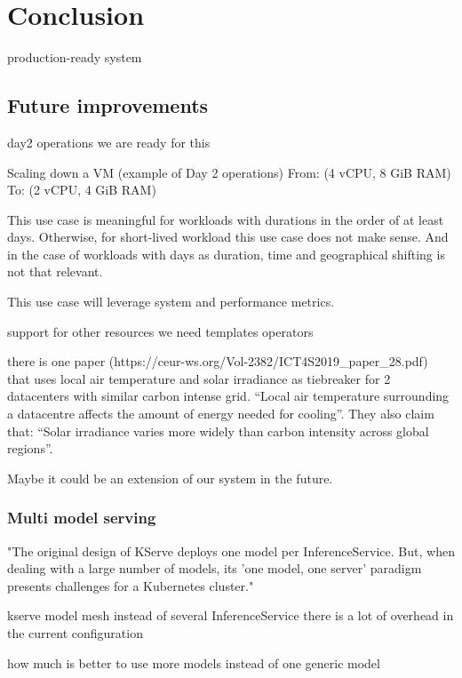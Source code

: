 \chapter{Conclusion}
\label{cha:conclusion}


production-ready system

\section{Future improvements}

day2 operations
we are ready for this

Scaling down a VM (example of Day 2 operations)
From: (4 vCPU, 8 GiB RAM)
To: (2 vCPU, 4 GiB RAM)

This use case is meaningful for workloads with durations in the order of at least days. Otherwise, for short-lived workload this use case does not make sense.
And in the case of workloads with days as duration, time and geographical shifting is not that relevant.

This use case will leverage system and performance metrics.








support for other resources
we need
templates
operators



there is one paper (https://ceur-ws.org/Vol-2382/ICT4S2019_paper_28.pdf) that uses local air temperature and solar irradiance as tiebreaker for 2 datacenters with similar carbon intense grid. 
“Local air temperature surrounding a datacentre affects the amount of energy needed for cooling”. 
They also claim that: “Solar irradiance varies more widely than carbon intensity across global regions”.

Maybe it could be an extension of our system in the future.


\subsection{Multi model serving}
"The original design of KServe deploys one model per InferenceService. But, when dealing with a large number of models, its 'one model, one server' paradigm presents challenges for a Kubernetes cluster."

kserve model mesh instead of several InferenceService
there is a lot of overhead in the current configuration

how much is better to use more models instead of one generic model 




\newpage

